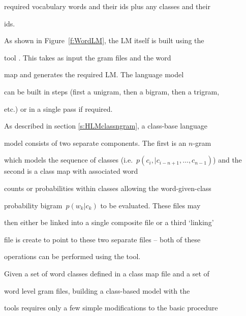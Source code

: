 required vocabulary words and their ids plus any classes and their


ids.





As shown in Figure~\ref{f:WordLM}, the LM itself is built using the


tool .  This takes as input the gram files and the word


map and generates the required LM.  The language model


can be built in steps (first a unigram, then a bigram, then a trigram,


etc.) or in a single pass if required.


















As described in section \ref{s:HLMclassngram}, a class-base language


model consists of two separate components.  The first is an $n$-gram


which models the sequence of classes (i.e.\ $p(c_i, | c_{i-n+1},


\ldots, c_{n-1})$) and the second is a class map with associated word


counts or probabilities within classes allowing the word-given-class


probability bigram\ $p(w_k|c_k)$ to be evaluated.  These files may


then either be linked into a single composite file or a third `linking'


file is create to point to these two separate files -- both of these


operations can be performed using the  tool.





Given a set of word classes defined in a class map file and a set of


word level gram files, building a class-based model with the \HTK\


tools requires only a few simple modifications to the basic procedure



